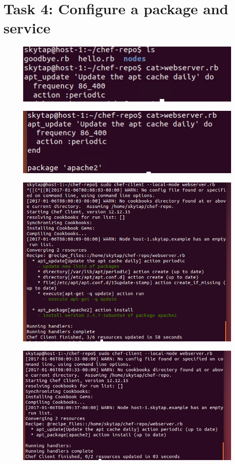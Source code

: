 \documentclass[12pt,letterpaper,boxed]{hmcpset}
\begin{document}
\section*{Task 4: Configure a package and service}
\begin{figure}[H]
  \centering
  \includegraphics[width = 1.0\textwidth]{13.png}
\end{figure}
\begin{figure}[H]
  \centering
  \includegraphics[width = 1.0\textwidth]{14.png}
\end{figure}
\begin{figure}[H]
  \centering
  \includegraphics[width = 1.0\textwidth]{15.png}
\end{figure}
\begin{figure}[H]
  \centering
  \includegraphics[width = 1.0\textwidth]{16.png}
\end{figure}
\end{document}
